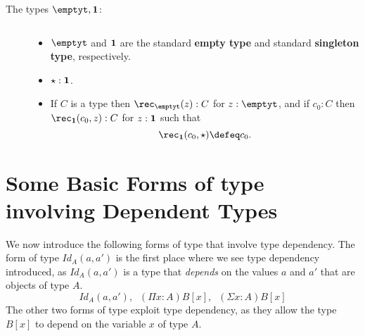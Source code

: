 {{\begin{description}
\item[The types $\emptyt,\unitt$:] $\;$
\begin{itemize}
\item $\emptyt$ and ${\bf 1}$ are the standard {\bf empty type} and standard 
{\bf singleton type}, respectively.
\item $\star :{\bf 1}$.
\item If $C$ is a type then $\rec_\emptyt(z):C$ for $z:\emptyt$, and if $c_0:C$ then $\rec_\unitt(c_0,z):C$ for $z:{\bf 1}$ such that 
  \[ \rec_\unitt(c_0,\star)\defeq c_0.\]
\end{itemize}

\end{description}

\section{Some Basic Forms of type involving Dependent Types}
We now introduce the following forms of type that involve type dependency.  The form of type $Id_A(a,a')$ is the first place where we see type dependency introduced, as $Id_A(a,a')$ is a type that {\it depends} on the values $a$ and $a'$ that are objects of type $A$.
  \[ Id_A(a,a'),\;\; (\Pi x:A)B[x],\;\; (\Sigma x:A)B[x]\]
The other two forms of type exploit type dependency, as they allow the type $B[x]$ to depend on the variable $x$ of type $A$.

}}
